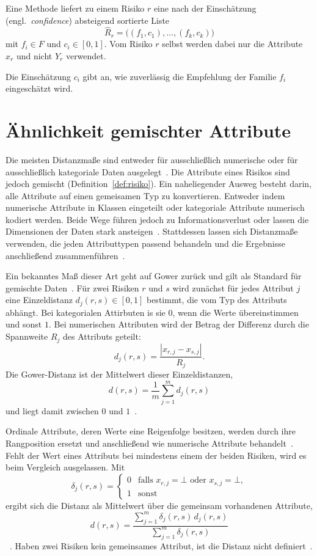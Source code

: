 \begin{definition}[Empfehlung]\label{def:empfehlung}
Eine Methode liefert zu einem Risiko $r$ eine nach der Einschätzung (engl.~\emph{confidence}) absteigend sortierte Liste
\[
\hat{R}_r = \big((f_1, c_1), \ldots, (f_k, c_k)\big)
\]
mit $f_i \in F$ und $c_i \in [0,1]$.
Vom Risiko $r$ selbst werden dabei nur die Attribute $x_r$ und nicht $Y_r$ verwendet.
\end{definition}
Die Einschätzung $c_i$ gibt an, wie zuverlässig die Empfehlung der Familie $f_i$ eingeschätzt wird.

\section{Ähnlichkeit gemischter Attribute}\label{sec:aehnlichkeit}
Die meisten Distanzmaße sind entweder für ausschließlich numerische oder für ausschließlich kategoriale Daten ausgelegt~\cite[S.1--2]{Velden2019}.
Die Attribute eines Risikos sind jedoch gemischt (Definition~\ref{def:risiko}).
Ein naheliegender Ausweg besteht darin, alle Attribute auf einen gemeisamen Typ zu konvertieren.
Entweder indem numerische Attribute in Klassen eingeteilt oder kategoriale Attribute numerisch kodiert werden.
Beide Wege führen jedoch zu Informationsverlust oder lassen die Dimensionen der Daten stark ansteigen~\cites[S.~82--84]{Foss2019}[S.~7]{Tarsitano2011}.
Stattdessen lassen sich Distanzmaße verwenden, die jeden Attributtypen passend behandeln und die Ergebnisse anschließend zusammenführen~\cite[S.~3]{Velden2019}.

Ein bekanntes Maß dieser Art geht auf Gower zurück und gilt als Standard für gemischte Daten~\cites[s.~3]{Velden2019}[S.~89]{Foss2019}.
Für zwei Risiken $r$ und $s$ wird zunächst für jedes Attribut $j$ eine Einzeldistanz $d_j(r,s) \in [0,1]$ bestimmt, die vom Typ des Attributs abhängt.
Bei kategorialen Attirbuten is sie $0$, wenn die Werte übereinstimmen und sonst $1$.
Bei numerischen Attributen wird der Betrag der Differenz durch die Spannweite $R_j$ des Attributs geteilt:
\[
d_j(r,s) = \frac{|x_{r,j} - x_{s,j}|}{R_j}.
\]
Die Gower-Distanz ist der Mittelwert dieser Einzeldistanzen,
\[
d(r,s) = \frac{1}{m} \sum_{j=1}^{m} d_j(r,s)
\]
und liegt damit zwischen $0$ und $1$~\cite[S.~4--5]{DOrazio2021}.

Ordinale Attribute, deren Werte eine Reigenfolge besitzen, werden durch ihre Rangposition ersetzt und anschließend wie numerische Attribute behandelt~\cites[S.~5]{DOrazio2021}[S.~9]{Tarsitano2011}.
Fehlt der Wert eines Attributs bei mindestens einem der beiden Risiken, wird es beim Vergleich ausgelassen.
Mit
\[
\delta_j(r,s) =
\begin{cases}
  0 & \text{falls } x_{r,j} = \bot \text{ oder } x_{s,j} = \bot,\\
  1 & \text{sonst}
\end{cases}
\]
ergibt sich die Distanz als Mittelwert über die gemeinsam vorhandenen Attribute,
\[
d(r,s) = \frac{\sum_{j=1}^{m} \delta_j(r,s)\, d_j(r,s)}{\sum_{j=1}^{m} \delta_j(r,s)}
\]
~\cites[S.~5--6]{DOrazio2021}[S.~8]{Tarsitano2011}.
Haben zwei Risiken kein gemeinsames Attribut, ist die Distanz nicht definiert~\cite[S.~6]{DOrazio2021}.

